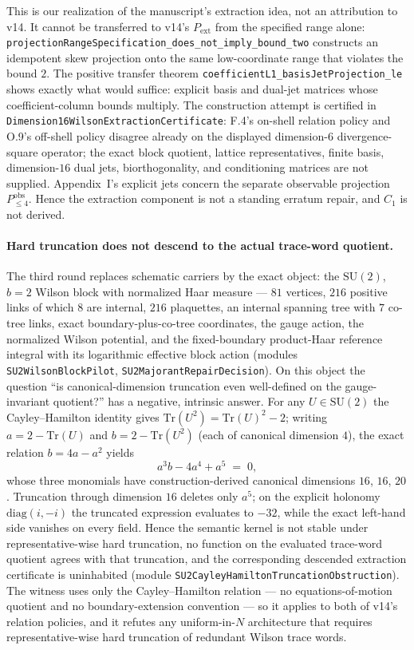 \documentclass[11pt]{article}
\theoremstyle{definition}
\newcommand{\Tr}{\mathrm{Tr}}
\begin{document}
This is our realization of the manuscript's extraction idea, not an attribution
to v14. It cannot be transferred to v14's $P_{\mathrm{ext}}$ from the specified
range alone: \texttt{projectionRangeSpecification\_does\_not\_imply\_bound\_two}
constructs an idempotent skew projection onto the same low-coordinate range
that violates the bound $2$. The positive transfer theorem
\texttt{coefficientL1\_basisJetProjection\_le} shows exactly what would suffice:
explicit basis and dual-jet matrices whose coefficient-column bounds multiply.
The construction attempt is certified in
\texttt{Dimension16WilsonExtractionCertificate}: F.4's on-shell relation
policy and O.9's off-shell policy disagree already on the displayed
dimension-$6$ divergence-square operator; the exact block quotient, lattice
representatives, finite basis, dimension-$16$ dual jets, biorthogonality, and
conditioning matrices are not supplied. Appendix~I's explicit jets concern
the separate observable projection $P^{\mathrm{obs}}_{\leq4}$. Hence the
extraction component is not a standing erratum repair, and $C_1$ is not derived.

\paragraph{Hard truncation does not descend to the actual trace-word quotient.}
The third round replaces schematic carriers by the exact object: the
$\mathrm{SU}(2)$, $b=2$ Wilson block with normalized Haar measure --- $81$
vertices, $216$ positive links of which $8$ are internal, $216$ plaquettes,
an internal spanning tree with $7$ co-tree links, exact boundary-plus-co-tree
coordinates, the gauge action, the normalized Wilson potential, and the
fixed-boundary product-Haar reference integral with its logarithmic effective
block action (modules \texttt{SU2WilsonBlockPilot},
\texttt{SU2MajorantRepairDecision}). On this object the question ``is
canonical-dimension truncation even well-defined on the gauge-invariant
quotient?'' has a negative, intrinsic answer. For any $U\in\mathrm{SU}(2)$
the Cayley--Hamilton identity gives $\Tr(U^2)=\Tr(U)^2-2$; writing
$a=2-\Tr(U)$ and $b=2-\Tr(U^2)$ (each of canonical dimension $4$), the exact
relation $b=4a-a^2$ yields
\[
  a^3b-4a^4+a^5 \;=\; 0,
\]
whose three monomials have construction-derived canonical dimensions $16$,
$16$, $20$. Truncation through dimension $16$ deletes only $a^5$; on the
explicit holonomy $\mathrm{diag}(i,-i)$ the truncated expression evaluates to
$-32$, while the exact left-hand side vanishes on every field. Hence the
semantic kernel is not stable under representative-wise hard truncation, no
function on the evaluated trace-word quotient agrees with that truncation,
and the corresponding descended extraction certificate is uninhabited
(module \texttt{SU2CayleyHamiltonTruncationObstruction}). The witness uses
only the Cayley--Hamilton relation --- no equations-of-motion quotient and no
boundary-extension convention --- so it applies to both of v14's relation
policies, and it refutes any uniform-in-$N$ architecture that requires
representative-wise hard truncation of redundant Wilson trace words.
\end{document}
